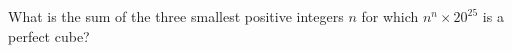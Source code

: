 What is the sum of the three smallest positive integers $n$ for which $n^n \times 20^{25}$ is a perfect cube?
